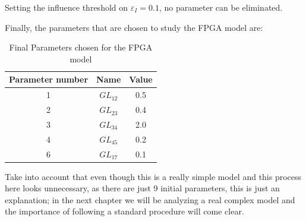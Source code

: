  Setting the influence threshold on $\varepsilon_I = 0.1$, no parameter can be eliminated. 

 Finally, the parameters that are chosen to study the FPGA model are:
 \begin{table}[H]
    \centering
    \caption{Final Parameters chosen for the FPGA model}
    \label{tab:finalparamsFPGA}
    
    \begin{tabular}{c c c}
    \toprule
    \multicolumn{1}{c}{\textbf{Parameter number}} & \multicolumn{1}{c}{\textbf{Name}} & \multicolumn{1}{c}{\textbf{Value}} \\ \midrule
    1 & $GL_{12}$ & 0.5 \\
    2 & $GL_{23}$ & 0.4 \\
    3 & $GL_{34}$ & 2.0 \\
    4 & $GL_{45}$ & 0.2 \\
    6 & $GL_{17}$ & 0.1 \\
     \bottomrule  
    \end{tabular}
    \end{table}

 Take into account that even though this is a really simple model and this process here looks unnecessary, as there are just 9 initial parameters, this is just an explanation; in the next chapter we will be analyzing a real complex model and the importance of following a standard procedure will come clear.




















